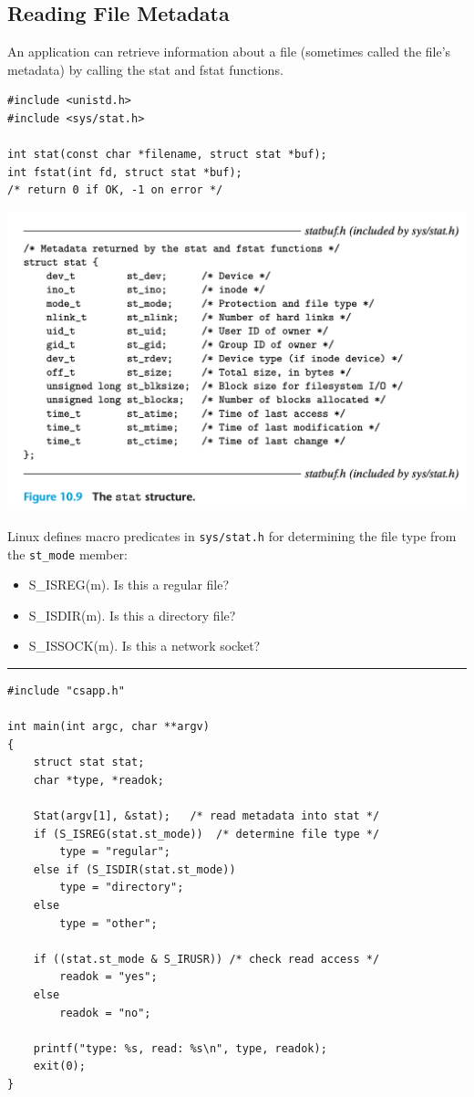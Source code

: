 \documentclass[11pt]{article}
\begin{document}
\subsection{Reading File Metadata}
\label{sec:orgf7b9456}
An application can retrieve information about a file (sometimes called the file’s metadata) by calling the stat and fstat functions.\\

\begin{verbatim}
#include <unistd.h>
#include <sys/stat.h>

int stat(const char *filename, struct stat *buf);
int fstat(int fd, struct stat *buf);
/* return 0 if OK, -1 on error */
\end{verbatim}

\begin{center}
\includegraphics[width=.9\linewidth]{pics/figure10.9-stat.png}
\end{center}

Linux defines macro predicates in \texttt{sys/stat.h} for determining the file type from the \texttt{st\_mode} member:\\
\begin{itemize}
\item S\_ISREG(m). Is this a regular file?\\
\item S\_ISDIR(m). Is this a directory file?\\
\item S\_ISSOCK(m). Is this a network socket?\\
\end{itemize}


\noindent\rule{\textwidth}{0.5pt}
\begin{verbatim}
#include "csapp.h"

int main(int argc, char **argv)
{
    struct stat stat;
    char *type, *readok;

    Stat(argv[1], &stat);	/* read metadata into stat */
    if (S_ISREG(stat.st_mode))	/* determine file type */
        type = "regular";
    else if (S_ISDIR(stat.st_mode))
        type = "directory";
    else
        type = "other";

    if ((stat.st_mode & S_IRUSR)) /* check read access */
        readok = "yes";
    else
        readok = "no";

    printf("type: %s, read: %s\n", type, readok);
    exit(0);
}

\end{verbatim}
\end{document}
